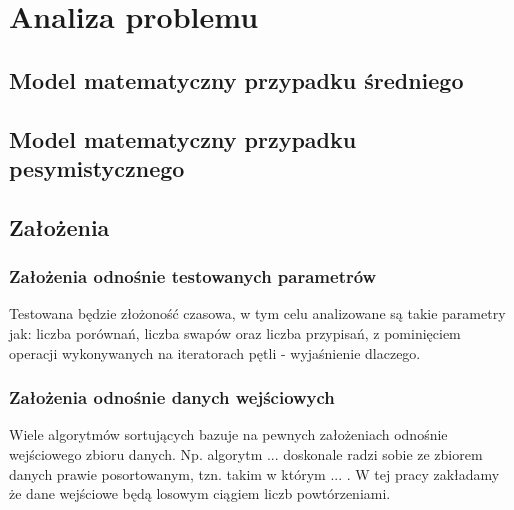 \chapter{Analiza problemu}

\section{Model matematyczny przypadku średniego}

\section{Model matematyczny przypadku pesymistycznego}

\section{Założenia}

\subsection{Założenia odnośnie testowanych parametrów}
Testowana będzie złożoność czasowa, w tym celu analizowane są takie parametry jak: liczba porównań,
liczba swapów oraz liczba przypisań, z pominięciem operacji wykonywanych na iteratorach pętli -
wyjaśnienie dlaczego.

\subsection{Założenia odnośnie danych wejściowych}
Wiele algorytmów sortujących bazuje na pewnych założeniach odnośnie wejściowego zbioru danych.
Np. algorytm ... doskonale radzi sobie ze zbiorem danych prawie posortowanym, tzn.
takim w którym ... . W tej pracy zakładamy że dane wejściowe będą losowym ciągiem liczb powtórzeniami.
